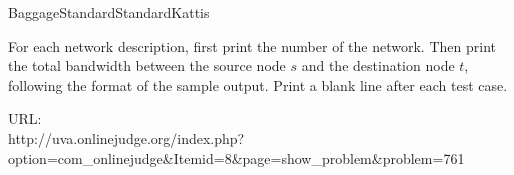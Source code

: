 \begin{problema}{Baggage}{Standard}{Standard}{Kattis}
\OutputFile

For each network description, first print the number of the network. Then print the total bandwidth between the source node $s$ and the destination node $t$, following the format of the sample output. Print a blank line after each test case.  \\


\Example




URL: \\
http://uva.onlinejudge.org/index.php?
\\option=com\_onlinejudge\&Itemid=8\&page=show\_problem\&problem=761

\end{problema}
